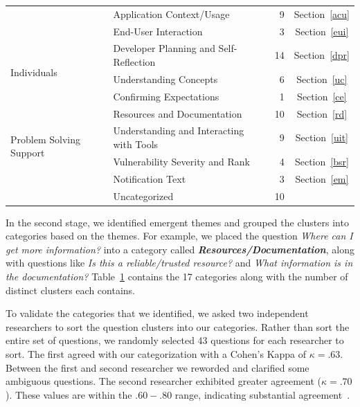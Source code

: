 \documentclass{sig-alternate}
\begin{document}
\begin{table}
\begin{tabularx}{\textwidth}{|l|X|r|c|}
    									& Application Context/Usage										& 9     		& Section~\ref{acu}			\\

    									& End-User Interaction											& 3     		& Section~\ref{eui}		\\
    \hline	
    \multirow{3}{*}{Individuals}	
    									& Developer Planning and Self-Reflection						& 14    		& Section~\ref{dpr}		\\

    									& Understanding Concepts										& 6 			& Section~\ref{uc}			\\

    									& Confirming Expectations					 					& 1				& Section~\ref{ce}  \\
    \hline
	\multirow{4}{*}{Problem Solving Support}

   	 									& Resources and Documentation									& 10     		& Section~\ref{rd}		\\
   	 									
 
    									
    									& Understanding and Interacting with Tools						& 9     		& Section~\ref{uit}			\\

										& Vulnerability Severity and Rank								& 4     		& Section~\ref{bsr}		\\
 
    									& Notification Text												& 3     		& Section~\ref{em}		\\
  
    \hline	
       									& Uncategorized													& 10    		&			 \\
    \hline
\end{tabularx}
\label{table:categories}
\end{table}


In the second stage, we identified emergent themes and grouped the clusters into categories based on the themes. 
For example, we placed the question \textit{Where can I get more information?} into a category called \emph{\textbf{Resources/Documentation}}, along with questions like \textit{Is this a reliable/trusted resource?} and \textit{What information is in the documentation?} 
Table~\ref{table:categories} contains the 17 categories along with the number of distinct clusters each contains. 

To validate the categories that we identified, we asked two independent researchers to sort the question clusters into our categories. 
Rather than sort the entire set of questions, we randomly selected 43 questions for each researcher to sort.
The first agreed with our categorization with a Cohen's Kappa of $\kappa = .63$. 
Between the first and second researcher we reworded and clarified some ambiguous questions. The second researcher exhibited greater agreement ($\kappa = .70$). 
These values are within the $.60 - .80$ range, indicating substantial agreement~\cite{Landis1977agreement}.
\end{document}
